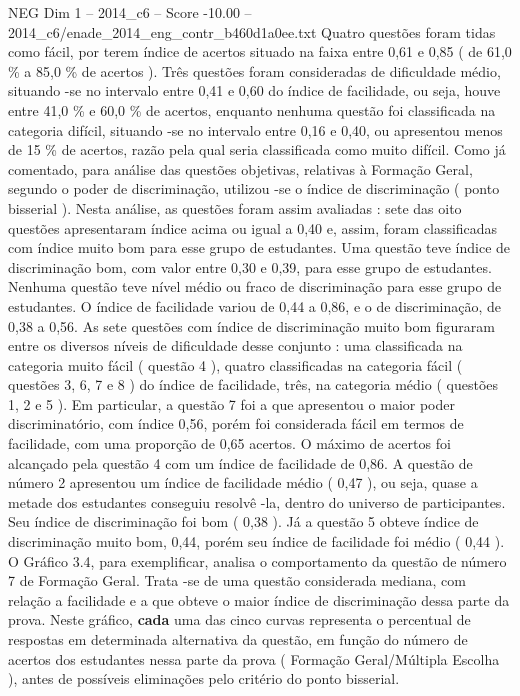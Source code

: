 \begin{textsample}{NEG Dim 1 – 2014\_c6 – Score -10.00 – 2014\_c6/enade\_2014\_eng\_contr\_b460d1a0ee.txt}
Quatro questões foram tidas como fácil, por terem índice de acertos situado na faixa entre 0,61 e 0,85 ( de 61,0 \% a 85,0 \% de acertos ).
Três questões foram consideradas de dificuldade médio, situando -se no intervalo entre 0,41 e 0,60 do índice de facilidade, ou seja, houve entre 41,0 \% e 60,0 \% de acertos, enquanto nenhuma questão foi classificada na categoria difícil, situando -se no intervalo entre 0,16 e 0,40, ou apresentou menos de 15 \% de acertos, razão pela qual seria classificada como muito difícil.
Como já comentado, para análise das questões objetivas, relativas à Formação Geral, segundo o poder de discriminação, utilizou -se o índice de discriminação ( ponto bisserial ).
Nesta análise, as questões foram assim avaliadas : sete das oito questões apresentaram índice acima ou igual a 0,40 e, assim, foram classificadas com índice muito bom para esse grupo de estudantes.
Uma questão teve índice de discriminação bom, com valor entre 0,30 e 0,39, para esse grupo de estudantes.
Nenhuma questão teve nível médio ou fraco de discriminação para esse grupo de estudantes.
O índice de facilidade variou de 0,44 a 0,86, e o de discriminação, de 0,38 a 0,56.
As sete questões com índice de discriminação muito bom figuraram entre os diversos níveis de dificuldade desse conjunto : uma classificada na categoria muito fácil ( questão 4 ), quatro classificadas na categoria fácil ( questões 3, 6, 7 e 8 ) do índice de facilidade, três, na categoria médio ( questões 1, 2 e 5 ).
Em particular, a questão 7 foi a que apresentou o maior poder discriminatório, com índice 0,56, porém foi considerada fácil em termos de facilidade, com uma proporção de 0,65 acertos.
O máximo de acertos foi alcançado pela questão 4 com um índice de facilidade de 0,86.
A questão de número 2 apresentou um índice de facilidade médio ( 0,47 ), ou seja, quase a metade dos estudantes conseguiu resolvê -la, dentro do universo de participantes.
Seu índice de discriminação foi bom ( 0,38 ).
Já a questão 5 obteve índice de discriminação muito bom, 0,44, porém seu índice de facilidade foi médio ( 0,44 ).
O Gráfico 3.4, para exemplificar, analisa o comportamento da questão de número 7 de Formação Geral.
Trata -se de uma questão considerada mediana, com relação a facilidade e a que obteve o maior índice de discriminação dessa parte da prova.
Neste gráfico, \textbf{cada} uma das cinco curvas representa o percentual de respostas em determinada alternativa da questão, em função do número de acertos dos estudantes nessa parte da prova ( Formação Geral/Múltipla Escolha ), antes de possíveis eliminações pelo critério do ponto bisserial.

\end{textsample}
